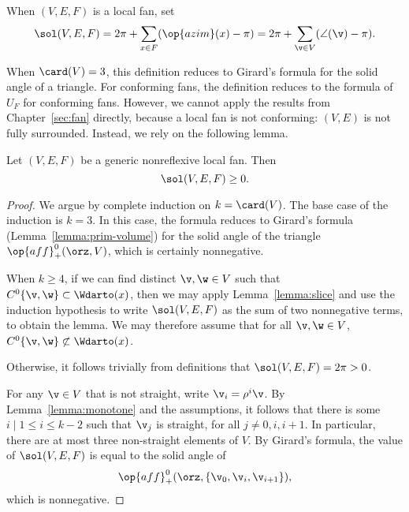 \begin{definition}  When $(V,E,F)$ is a local fan, set
\[
\sol(V,E,F) =  2\pi + \sum_{x\in F}(\op{azim}(x)-\pi) = 2\pi + \sum_{\v\in V} (\angle(\v) -\pi).
\]
\end{definition}

When $\card(V)=3$, this definition reduces to Girard's formula for the
solid angle of a triangle.  For conforming fans, the definition reduces
to the  formula of $U_F$ for conforming fans.
However, we cannot apply the results from Chapter~\ref{sec:fan}
directly, because a local fan is not conforming: $(V,E)$ is not fully
surrounded. Instead, we rely on the following lemma.


\begin{lemma}\label{lemma:sol-local}
Let $(V,E,F)$ be a generic nonreflexive local fan.  Then
\[
\sol(V,E,F) \ge 0.  %
\]
\end{lemma}

\begin{proof} 
  We argue by complete induction on $k=\card(V)$.  The base case of
  the induction is $k=3$.  In this case, the formula reduces to
  Girard's formula (Lemma~\ref{lemma:prim-volume}) for the solid angle
  of the triangle $\op{aff}_+^0(\orz,V)$, which is certainly
  nonnegative.

  When $k\ge4$, if we can find distinct $\v,\w\in V$ such that
  $C^0\{\v,\w\}\subset \Wdarto(x)$, then we may apply
  Lemma~\ref{lemma:slice} and use the induction hypothesis to write
  $\sol(V,E,F)$ as the sum of two nonnegative terms, to obtain the
  lemma.  We may therefore assume that for all $\v,\w\in V$,
  $C^0\{\v,\w\}\not\subset \Wdarto(x)$.

  Otherwise,
it follows trivially from definitions that $\sol(V,E,F)=2\pi>0$.

For any $\v\in V$ that is not straight, write $\v_i = \rho^i\v$.  By
Lemma~\ref{lemma:monotone} and the assumptions, it follows that there
is some $i\mid 1 \le i \le k-2$ such that $\v_j$ is straight, for all
$j\ne 0,i,i+1$.  In particular, there are at most three non-straight
elements of $V$.  By Girard's formula, the value of $\sol(V,E,F)$ is
equal to the solid angle of
\[
\op{aff}_+^0(\orz,\{\v_0,\v_i,\v_{i+1}\}),
\]
which is nonnegative.
\end{proof}



